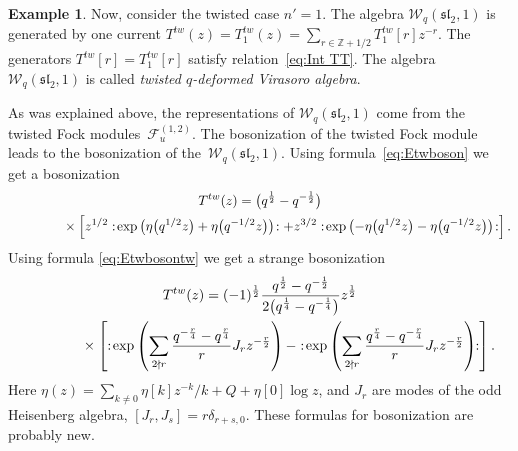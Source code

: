 \documentclass[pdftex]{sigma}
\numberwithin{equation}{section}
\theoremstyle{definition}
\newtheorem{Example}[Theorem]{Example}
\newcommand{\half}{\frac{1}{2}}
\begin{document}
\begin{Example}Now, consider the twisted case $n'=1$. The algebra $\mathcal{W}_q(\mathfrak{sl}_2,1)$ is generated by one current $T^{tw}(z)=T_1^{tw}(z)=\sum\limits_{r \in \mathbb{Z}+1/2} T_1^{tw}[r] z^{-r}$. The generators $T^{tw}[r]=T_1^{tw}[r]$ satisfy relation~\eqref{eq:Int TT}. The algebra $\mathcal{W}_q(\mathfrak{sl}_2,1)$ is called \emph{twisted $q$-deformed Virasoro algebra}.

As was explained above, the representations of $\mathcal{W}_q(\mathfrak{sl}_2,1)$ come from the twisted Fock modu\-les~$\mathcal{F}_u^{(1,2)}.\!$ The bosonization of the twisted Fock module leads to the bosonization of the~$\mathcal{W}_q(\mathfrak{sl}_2,1)$. Using formula~\eqref{eq:Etwboson} we get a bosonization
\begin{gather*}
T^{tw} (z) = \big(q^{\half}-q^{-\half}\big) \\
\hphantom{T^{tw} (z) =}{} \times \left[ z^{1/2} :\!\exp \big( \eta\big(q^{1/2} z\big) + \eta\big(q^{-1/2} z\big) \big)\!: + z^{3/2}:\! \exp \big( {-}\eta\big(q^{1/2} z\big) - \eta\big(q^{-1/2} z\big) \big)\!: \right].
\end{gather*}
Using formula \eqref{eq:Etwbosontw} we get a strange bosonization
\begin{gather*}
T^{tw} (z) = (-1)^{\frac{1}{2}} \frac{q^{\half}-q^{-\half}}{2\big(q^{ \frac{1}{4}} - q^{-\frac{1}{4}}\big)} z^{\frac{1}{2}} \\
\hphantom{T^{tw} (z) =}{}\times \left[ : \! \exp \left( \sum_{2 \nmid r} \frac{q^{-\frac{r}{4}}-q^{\frac{r}{4}}}{r} J_r z^{-\frac{r}{2}} \right) - : \! \exp \left( \sum_{2 \nmid r} \frac{q^{\frac{r}{4}}-q^{-\frac{r}{4}}}{r} J_r z^{-\frac{r}{2}} \right) \! \!:\right].
\end{gather*}
Here $\eta(z) = \sum\limits_{k \neq 0} \eta[k] z^{-k}/k +Q + \eta[0] \log z$, and $J_r$ are modes of the odd Heisenberg algebra, $[J_r,J_s]=r\delta_{r+s,0}$. These formulas for bosonization are probably new.
\end{Example}
\end{document}
